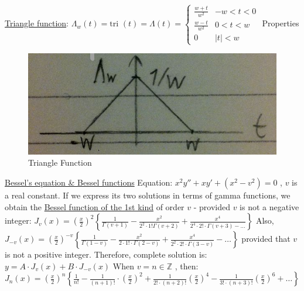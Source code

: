 \documentclass[12pt]{article}
\def\tri{\text{tri\ }} %
\begin{document}
\begin{flushleft}
	\textbullet \quad \uline{Triangle function}: $\displaystyle \Lambda_w (t) = \tri (t) = \Lambda (t) = 
	\begin{cases} 
		\frac{w+t}{w^2} & -w < t < 0 \\ 
		\frac{w-t}{w^2} & 0 < t < w \\ 
		0 & |t| < w 
	\end{cases} $ \linebreak 
	Properties \linebreak 
	
	\begin{figure}[H]
	\centering
	\includegraphics[scale=0.4]{triangleFunction}
	\caption{Triangle Function}
	\label{fig:triangleFunction}
	\end{figure}
	
	\uline{Bessel's equation \& Bessel functions} \linebreak 
	\textbullet \quad Equation: $x^2y'' + xy' + (x^2 -v^2) = 0$ , $v$ is a real constant. \linebreak 
	If we express its two solutions in terms of gamma functions, we obtain the \uline{Bessel function of the 1st kind} of order $v$ - provided $v$ is not a negative integer: \linebreak 
	$\displaystyle J_v (x) = \left(\frac{x}{2} \right)^2 \left\{ \frac{1}{\Gamma (v+1)} - \frac{x^2}{2^2 \cdot 1! \Gamma (v+2)} + \frac{x^4}{2^4 \cdot 2! \cdot \Gamma (v+3) - \ldots} \right\} $ \textbullet \quad 
	Also, $\displaystyle J_{-v} (x) = \left( \frac{x}{2} \right)^{-v} \left\{ \frac{1}{\Gamma (1-v)} - \frac{x^2}{2 \cdot 1! \cdot \Gamma (2-v)} + \frac{x^4}{2^2 \cdot 2! \cdot \Gamma (3-v)} - \ldots \right\} $ \linebreak 
	provided that $v$ is not a positive integer. \linebreak 
	Therefore, complete solution is: $y=A \cdot J_v (x) + B\cdot J_{-v} (x) $ \linebreak 
	When $v=n \in \mathbb{Z}$ , then: $\displaystyle J_n (x) = \left( \frac{x}{2} \right)^n \left\{ \frac{1}{n!} - \frac{1}{(n+1)!} \cdot \left( \frac{x}{2} \right)^2 + \frac{1}{2! \cdot (n+2)!} \left( \frac{x}{2} \right)^4 - \frac{1}{3! \cdot (n+3)!} \left( \frac{x}{2} \right)^6 + \ldots \right\} $ \linebreak 
	

\end{flushleft}
\end{document}
